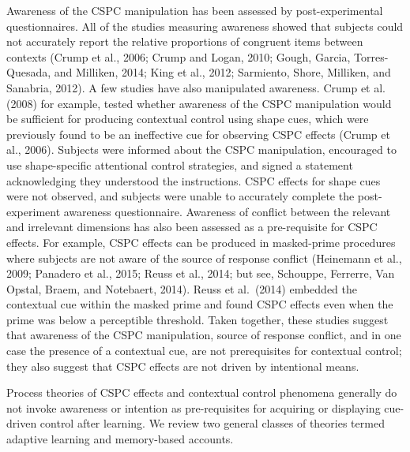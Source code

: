 \documentclass[]{DissertateCUNY}
\begin{document}
Awareness of the CSPC manipulation has been assessed by
post-experimental questionnaires. All of the studies measuring awareness
showed that subjects could not accurately report the relative
proportions of congruent items between contexts (Crump et al., 2006;
Crump and Logan, 2010; Gough, Garcia, Torres-Quesada, and Milliken,
2014; King et al., 2012; Sarmiento, Shore, Milliken, and Sanabria,
2012). A few studies have also manipulated awareness. Crump et al.
(2008) for example, tested whether awareness of the CSPC manipulation
would be sufficient for producing contextual control using shape cues,
which were previously found to be an ineffective cue for observing CSPC
effects (Crump et al., 2006). Subjects were informed about the CSPC
manipulation, encouraged to use shape-specific attentional control
strategies, and signed a statement acknowledging they understood the
instructions. CSPC effects for shape cues were not observed, and
subjects were unable to accurately complete the post-experiment
awareness questionnaire. Awareness of conflict between the relevant and
irrelevant dimensions has also been assessed as a pre-requisite for CSPC
effects. For example, CSPC effects can be produced in masked-prime
procedures where subjects are not aware of the source of response
conflict (Heinemann et al., 2009; Panadero et al., 2015; Reuss et al.,
2014; but see, Schouppe, Ferrerre, Van Opstal, Braem, and Notebaert,
2014). Reuss et al.~(2014) embedded the contextual cue within the masked
prime and found CSPC effects even when the prime was below a perceptible
threshold. Taken together, these studies suggest that awareness of the
CSPC manipulation, source of response conflict, and in one case the
presence of a contextual cue, are not prerequisites for contextual
control; they also suggest that CSPC effects are not driven by
intentional means.

Process theories of CSPC effects and contextual control phenomena
generally do not invoke awareness or intention as pre-requisites for
acquiring or displaying cue-driven control after learning. We review two
general classes of theories termed adaptive learning and memory-based
accounts.
\end{document}
